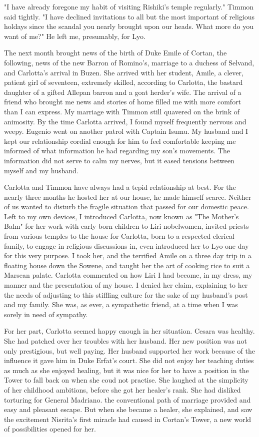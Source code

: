 \documentclass{article}
\begin{document}
"I have already foregone my habit of visiting Rishiki's temple regularly." Timmon said tightly. "I have declined invitations to all but the most important of religious holdays since the scandal you nearly brought upon our heads. What more do you want of me?" He left me, presumably, for Lyo.

\vspace{.5cm} 

The next month brought news of the birth of Duke Emile of Cortan, the following, news of the new Barron of Romino's, marriage to a duchess of Selvand, and Carlotta's arrival in Buzen. She arrived with her student, Amile, a clever, patient girl of seventeen, extremely skilled, according to Carlotta, the bastard daughter of a gifted Allepan barron and a goat herder's wife. The arrival of a friend who brought me news and stories of home filled me with more comfort than I can express. My marriage with Timmon still quavered on the brink of animosity. By the time Carlotta arrived, I found myself frequently nervous and weepy. Eugenio went on another patrol with Captain Isumu. My husband and I kept our relationship cordial enough for him to feel comfortable keeping me informed of what information he had regarding my son's movements. The information did not serve to calm my nerves, but it eased tensions between myself and my husband. 

Carlotta and Timmon have always had a tepid relationship at best. For the nearly three months he hosted her at our house, he made himself scarce. Neither of us wanted to disturb the fragile situation that passed for our domestic peace. Left to my own devices, I introduced Carlotta, now known as "The Mother's Balm" for her work with early born children to Liri nobelwomen, invited priests from various temples to the house for Carlotta, born to a respected clerical family, to engage in religious discussions in, even introduced her to Lyo one day for this very purpose. I took her, and the terrified Amile on a three day trip in a floating house down the Sowene, and taught her the art of cooking rice to suit a Marsean palate. Carlotta commented on how Liri I had become, in my dress, my manner and the presentation of my house. I denied her claim, explaining to her the needs of adjusting to this stiffling culture for the sake of my husband's post and my family. She was, as ever, a sympathetic friend, at a time when I was sorely in need of sympathy. 

For her part, Carlotta seemed happy enough in her situation. Cesara was healthy. She had patched over her troubles with her husband. Her new position was not only prestigious, but well paying. Her husband supported her work because of the influence it gave him in Duke Erfat's court. She did not enjoy her teaching duties as much as she enjoyed healing, but it was nice for her to have a position in the Tower to fall back on when she coud not practise. She laughed at the simplicity of her childhood ambitions, before she got her healer's rank. She had disliked torturing for General Madriano. the conventional path of marriage provided and easy and pleasant escape. But when she became a healer, she explained, and saw the excitement Nisrita's first miracle had caused in Cortan's Tower, a new world of possibilities opened for her. 
\end{document}
